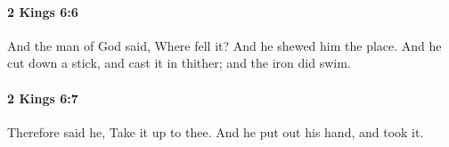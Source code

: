 		\paragraph{2 Kings 6:6} %
			\label{2KINGS-6-6}

			And the man of God said, Where fell it? And he shewed him the place. And he cut down a stick, and cast it in thither; and the iron did swim.


		\paragraph{2 Kings 6:7} %
			\label{2KINGS-6-7}

			Therefore said he, Take it up to thee. And he put out his hand, and took it.


